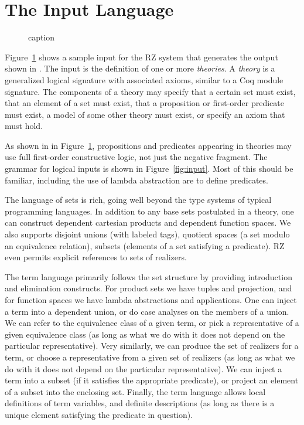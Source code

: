 \section{The Input Language}
\label{sec:input-language}

\begin{figure}[htbp]
	\caption{caption}
	\label{fig:typicalinput}
\end{figure}

Figure~\ref{fig:typicalinput} shows a sample input for the RZ system that
generates the output shown in . The input is the
definition of one or more \emph{theories}. A \emph{theory} is a generalized
logical signature with associated axioms, similar to a Coq module signature.
The components of a theory may specify that a certain set must exist, that an
element of a set must exist, that a proposition or first-order predicate must
exist, a model of some other theory must exist, or specify an axiom that must
hold.


As shown in in Figure~\ref{fig:typicalinput}, propositions and predicates
appearing in theories may use full first-order constructive logic, not just the
negative fragment. The grammar for logical inputs is shown in
Figure~\ref{fig:input}. Most of this should be familiar, including the use of
lambda abstraction are to define predicates.

The language of sets is rich, going well beyond the type systems of typical
programming languages. In addition to any base sets postulated in a theory, one
can construct dependent cartesian products and dependent function spaces. We
also supports disjoint unions (with labeled tags), quotient spaces (a set
modulo an equivalence relation), subsets (elements of a set satisfying a
predicate). RZ even permits explicit references to sets of realizers.

The term language primarily follows the set structure by providing
introduction and elimination constructs. For product sets we have tuples and
projection, and for function spaces we have lambda abstractions and
applications. One can inject a term into a dependent union, or do case analyses
on the members of a union. We can refer to the equivalence class of a given
term, or pick a representative of a given equivalence class (as long as what we
do with it does not depend on the particular representative). Very similarly,
we can produce the set of realizers for a term, or choose a representative from
a given set of realizers (as long as what we do with it does not depend on the
particular representative). We can inject a term into a subset (if it satisfies
the appropriate predicate), or project an element of a subset into the
enclosing set. Finally, the term language allows local definitions of term
variables, and definite descriptions (as long as there is a unique element
satisfying the predicate in question).


